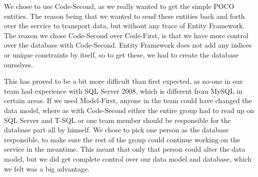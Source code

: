 We chose to use Code-Second, as we really wanted to get the simple POCO entities. The reason being that we wanted to send these entities back and forth over the service to transport data, but without any trace of Entity Framework. The reason we chose Code-Second over Code-First, is that we have more control over the database with Code-Second. Entity Framework does not add any indices or unique constraints by itself, so to get these, we had to create the database ourselves.

This has proved to be a bit more difficult than first expected, as no-one in our team had experience with SQL Server 2008, which is different from MySQL in certain areas. If we used Model-First, anyone in the team could have changed the data model, where as with Code-Second either the entire group had to read up on SQL Server and T-SQL or one team member should be responsible for the database part all by himself. We chose to pick one person as the database responsible, to make sure the rest of the group could continue working on the service in the meantime. This meant that only that person could alter the data model, but we did get complete control over our data model and database, which we felt was a big advantage.